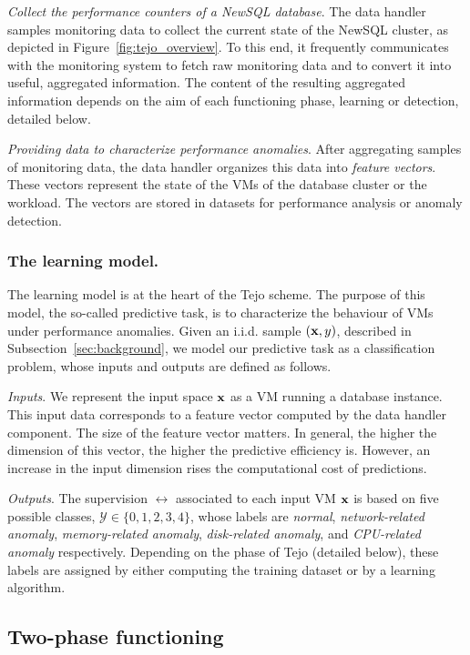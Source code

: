 \emph{Collect the performance counters of a NewSQL database}. The data handler samples monitoring data to collect the current state of the NewSQL cluster, as depicted in Figure~\ref{fig:tejo_overview}. To this end, it frequently communicates with the monitoring system to fetch raw monitoring data and to convert it into useful, aggregated information. The content of the resulting aggregated information depends on the aim of each functioning phase, learning or detection, detailed below. 

\emph{Providing data to characterize performance anomalies}. After aggregating samples of monitoring data, the data handler organizes this data into \emph{feature vectors}. These vectors represent the state of the VMs of the database cluster or the workload. The vectors are stored in datasets for performance analysis or anomaly detection. 

\subsubsection{The learning model.} 
The learning model is at the heart of the Tejo scheme. The purpose of this model, the so-called predictive task, is to characterize the behaviour of VMs under performance anomalies. Given an i.i.d. sample $({\bf x},y)$, described in Subsection~\ref{sec:background}, we model our predictive task as a classification problem, whose inputs and outputs are defined as follows.

\emph{Inputs}. We represent the input space ${\bf x}$ as a VM running a database instance. This input data corresponds to a feature vector computed by the data handler component. The size of the feature vector matters. In general, the higher the dimension of this vector, the higher the predictive efficiency is. However, an increase in the input dimension rises the computational cost of predictions.

\emph{Outputs}. The supervision $\rel$ associated to each input VM ${\bf x}$ is based on five possible classes, $\mathcal{Y} \in \{0,1,2,3,4\}$, whose labels are \emph{normal}, \emph{network-related anomaly}, \emph{memory-related anomaly}, \emph{disk-related anomaly}, and \emph{CPU-related anomaly} respectively. Depending on the phase of Tejo (detailed below), these labels are assigned by either computing the training dataset or by a learning algorithm.

\subsection{Two-phase functioning}
\label{subsec:tejo_phases}

